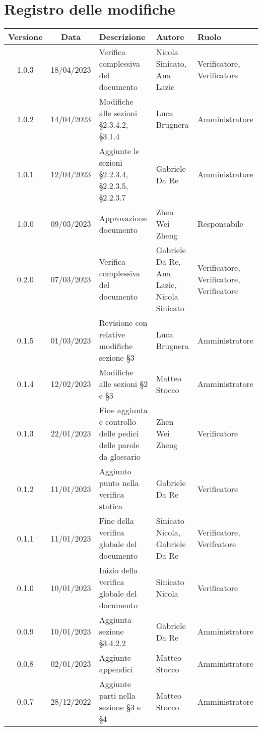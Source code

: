 \section*{Registro delle modifiche}
\begin{center}
\renewcommand\tabularxcolumn[1]{>{\Centering}m{#1}}
\setlength\extrarowheight{5pt}
\begin{tabularx}{\textwidth}{| c | c | X | X | X |} 
\hline
\rowcolor{white}
 \textbf{Versione} & \textbf{Data} & \textbf{Descrizione} & \textbf{Autore} & \textbf{Ruolo}\\
 \hline
 1.0.3 & 18/04/2023 & Verifica complessiva del documento & Nicola Sinicato, Ana Lazic & Verificatore, Verificatore\\
 \hline
 1.0.2 & 14/04/2023 & Modifiche alle sezioni §2.3.4.2, §3.1.4 & Luca Brugnera & Amministratore\\
 \hline
 1.0.1 & 12/04/2023 & Aggiunte le sezioni §2.2.3.4, §2.2.3.5, §2.2.3.7 & Gabriele Da Re & Amministratore\\
 \hline
 1.0.0 & 09/03/2023 & Approvazione documento & Zhen Wei Zheng & Responsabile\\
 \hline
 0.2.0 & 07/03/2023 & Verifica complessiva del documento & Gabriele Da Re, Ana Lazic, Nicola Sinicato & Verificatore, Verificatore, Verificatore\\
 \hline
 0.1.5 & 01/03/2023 & Revisione con relative modifiche sezione §3 & Luca Brugnera & Amministratore\\
 \hline
 0.1.4 & 12/02/2023 & Modifiche alle sezioni §2 e §3 & Matteo Stocco & Amministratore\\
 \hline
 0.1.3 & 22/01/2023 & Fine aggiunta e controllo delle pedici delle parole da glossario & Zhen Wei Zheng & Verificatore \\
 \hline
 0.1.2 & 11/01/2023 & Aggiunto punto nella verifica statica & Gabriele Da Re & Verificatore\\
 \hline
 0.1.1 & 11/01/2023 & Fine della verifica globale del documento & Sinicato Nicola, Gabriele Da Re & Verificatore, Verifcatore\\
 \hline
 0.1.0 & 10/01/2023 & Inizio della verifica globale del documento & Sinicato Nicola & Verificatore\\
 \hline
 0.0.9 & 10/01/2023 & Aggiunta sezione §3.4.2.2 & Gabriele Da Re & Amministratore\\
 \hline
 0.0.8 & 02/01/2023 & Aggiunte appendici & Matteo Stocco & Amministratore\\
 \hline
 0.0.7 & 28/12/2022 & Aggiunte parti nella sezione §3 e §4 & Matteo Stocco & Amministratore\\

\end{tabularx}
\end{center}

